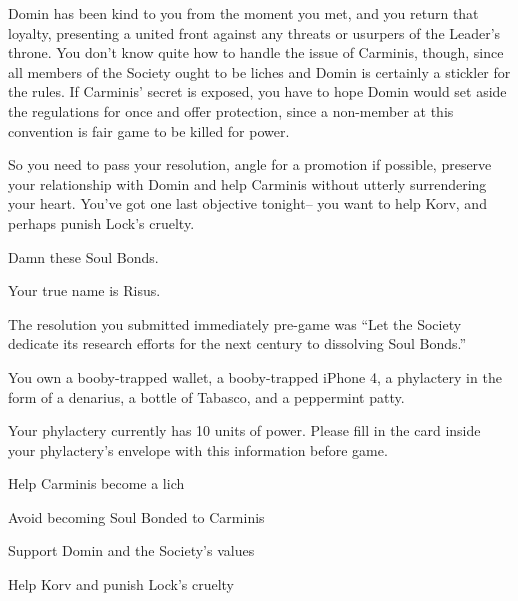 \documentclass[char]{Sel}
\begin{document}
Domin has been kind to you from the moment you met, and you return that loyalty, presenting a united front against any threats or usurpers of the Leader’s throne. You don't know quite how to handle the issue of Carminis, though, since all members of the Society ought to be liches and Domin is certainly a stickler for the rules. If Carminis' secret is exposed, you have to hope Domin would set aside the regulations for once and offer protection, since a non-member at this convention is fair game to be killed for power.

So you need to pass your resolution, angle for a promotion if possible, preserve your relationship with Domin and help Carminis without utterly surrendering your heart. You’ve got one last objective tonight-- you want to help Korv, and perhaps punish Lock's cruelty.

Damn these Soul Bonds.


\begin{itemz}[Notes]
  \item Your true name is Risus.
  \item The resolution you submitted immediately pre-game was ``Let the Society dedicate its research efforts for the next century to dissolving Soul Bonds.''
   \item You own a booby-trapped wallet, a booby-trapped iPhone 4, a phylactery in the form of a denarius, a bottle of Tabasco, and a peppermint patty.
   \item Your phylactery currently has 10 units of power. Please fill in the card inside your phylactery's envelope with this information before game.
    \end{itemz}
    
  
 \begin{itemz}[Goals]
\item Help Carminis become a lich
\item Avoid becoming Soul Bonded to Carminis
\item Support Domin and the Society's values
\item Help Korv and punish Lock's cruelty
\end{itemz}
\end{document}
